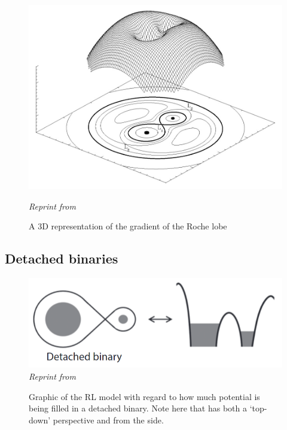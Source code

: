 \documentclass[12pt, a4paper]{article}
\begin{document}
    \vspace*{\fill}
    \begin{figure}[H]
        \centering
        \includegraphics[width=\textwidth]{figs/reused-figs/Wiki-RochePotential.jpg}
        \caption{ A 3D representation of the gradient of the Roche lobe}
        \label{fig:Roche_potential}
        \textit{\small Reprint from \parencite{vandersluys2005}}
    \end{figure}
    \vspace*{\fill}

        \subsection{\centering Detached binaries}\label{DetachedBinary}

        \begin{figure}[H]
            \centering
            \includegraphics[scale = .4]{figs/reused-figs/Tauris_DetachedBinary.png}\\
            \textit{Reprint from~\parencite{TaurisvandenHeuvel+2023}}
            \caption{Graphic of the RL model with regard to how much potential is being filled in a detached binary. Note here that has both a `top-down' perspective and from the side.}
            \label{DetachedBinaryRL}
        \end{figure}
\end{document}
